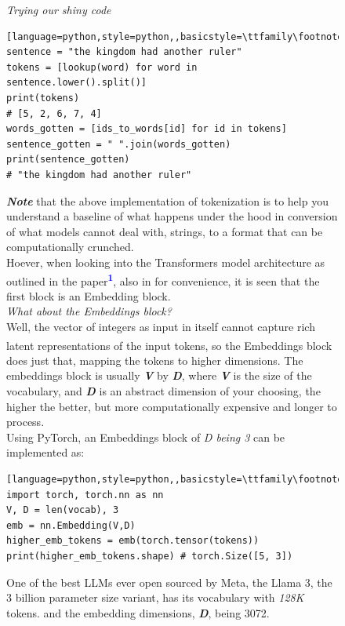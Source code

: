 \documentclass[12pt]{article}
\newcommand{\customtext}[3]{%
    \vspace{#2} %
    \fontsize{13}{8}\textcolor{#1}{\textit{#3}}%
}
\newcommand{\bandi}[1]{\textbf{\textit{#1}}}
\newcommand{\sidecite}[1]{\textsuperscript{\textcolor{blue}{\textbf{\scriptsize#1}}}}
\newcommand{\maincitecount}{\sidecite{\stepcounter{maincite}\themaincite}}
\begin{document}
\begin{figure}[!htb]
    \begin{minipage}[t]{0.65\textwidth}
    \raggedright
    \customtext{xtitle}{0em}{Trying our shiny code}\\
\begin{lstlisting}[language=python,style=python,,basicstyle=\ttfamily\footnotesize]
sentence = "the kingdom had another ruler"
tokens = [lookup(word) for word in sentence.lower().split()]
print(tokens)
# [5, 2, 6, 7, 4]
words_gotten = [ids_to_words[id] for id in tokens]
sentence_gotten = " ".join(words_gotten)
print(sentence_gotten)
# "the kingdom had another ruler"
\end{lstlisting}
\textbf{\textit{\small Note}} that the above implementation of tokenization is to help you understand a baseline of what happens 
under the hood in conversion of what models cannot deal with, strings, to a format that can be computationally 
crunched.\\
Hoever, when looking into the Transformers model architecture as outlined in the paper\sidecite{1}, also in{\maincitecount}
for convenience, it is seen that the first block is an Embedding block.\\
\customtext{xtitle}{1em}{What about the Embeddings block?}\\
Well, the vector of integers as input in itself cannot capture rich latent representations of the input tokens, 
so the Embeddings block{\maincitecount} does just that, mapping the tokens to higher dimensions. The embeddings block is usually 
\bandi{V} by \bandi{D}, where \bandi{V} is the size of the vocabulary, and \bandi{D} is an abstract dimension of your choosing, 
the higher the better, but more computationally expensive and longer to process.\\
Using PyTorch, an Embeddings block of {\it D being 3} can be implemented as:
\begin{lstlisting}[language=python,style=python,,basicstyle=\ttfamily\footnotesize]
import torch, torch.nn as nn 
V, D = len(vocab), 3
emb = nn.Embedding(V,D)
higher_emb_tokens = emb(torch.tensor(tokens))
print(higher_emb_tokens.shape) # torch.Size([5, 3])
\end{lstlisting}
One of the best LLMs ever open sourced by Meta, the Llama 3, the 3 billion parameter size variant, has its vocabulary with {\it 128K} tokens.
and the embedding dimensions, \bandi{D}, being 3072.
    \end{minipage}%
    \hspace{25pt}
    \begin{minipage}[t]{.4\textwidth}

\end{minipage}
\end{figure}
\end{document}
